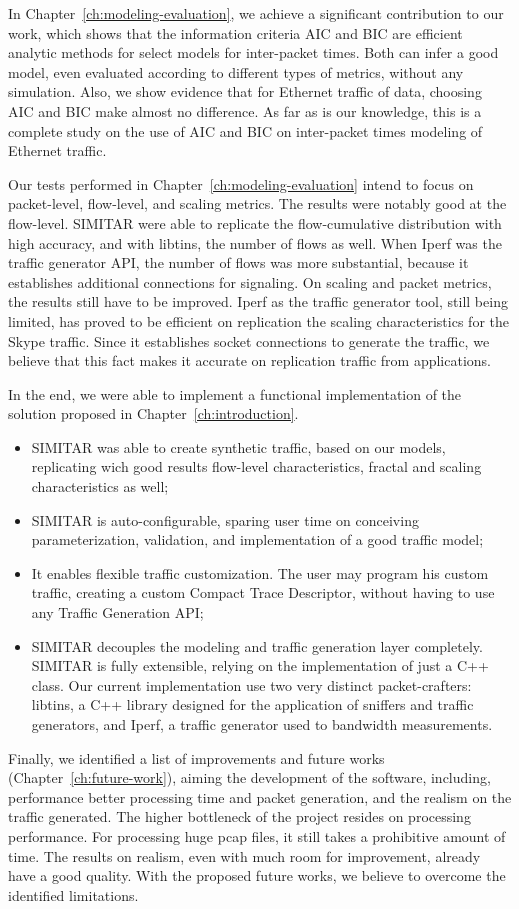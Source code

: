 In Chapter~\ref{ch:modeling-evaluation}, we achieve a significant contribution to our work, which shows that the information criteria AIC and BIC are efficient analytic methods for select models for inter-packet times. Both can infer a good model, even evaluated according to different types of metrics, without any simulation. Also, we show evidence that for Ethernet traffic of data, choosing AIC and BIC make almost no difference. As far as is our knowledge, this is a complete study on the use of AIC and BIC on inter-packet times modeling of Ethernet traffic.

Our tests performed in Chapter~\ref{ch:modeling-evaluation} intend to focus on packet-level, flow-level, and scaling metrics. The results were notably good at the flow-level. SIMITAR were able to replicate the flow-cumulative distribution with high accuracy, and with libtins, the number of flows as well. When Iperf was the traffic generator API, the number of flows was more substantial, because it establishes additional connections for signaling. On scaling and packet metrics, the results still have to be improved. Iperf as the traffic generator tool, still being limited, has proved to be efficient on replication the scaling characteristics for the Skype traffic. Since it establishes socket connections to generate the traffic, we believe that this fact makes it accurate on replication traffic from applications.

In the end, we were able to implement a functional implementation of the solution proposed in Chapter~\ref{ch:introduction}.  
\begin{itemize}
\item SIMITAR was able to create synthetic traffic, based on our models, replicating wich good results flow-level characteristics, fractal and scaling characteristics as well;
\item SIMITAR is auto-configurable, sparing user time on conceiving parameterization, validation, and implementation of a good traffic model;
\item It enables flexible traffic customization. The user may program his custom traffic, creating a custom Compact Trace Descriptor, without having to use any Traffic Generation API;  
\item SIMITAR decouples the modeling and traffic generation layer completely. SIMITAR is fully extensible, relying on the implementation of just a C++ class.  Our current implementation use two very distinct packet-crafters: libtins, a C++ library designed for the application of sniffers and traffic generators, and Iperf, a traffic generator used to bandwidth measurements. 
\end{itemize}

Finally, we identified a list of improvements and future works (Chapter~\ref{ch:future-work}), aiming the development of the software, including, performance better processing time and packet generation, and the realism on the traffic generated. The higher bottleneck of the project resides on processing performance. For processing huge pcap files, it still takes a prohibitive amount of time. The results on realism, even with much room for improvement, already have a good quality. With the proposed future works, we believe to overcome the identified limitations.

